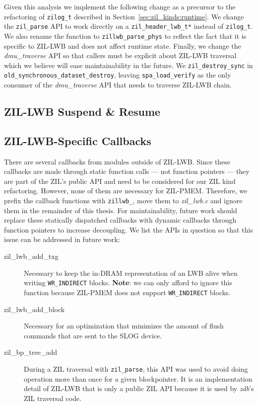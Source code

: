\documentclass[12pt,a4paper,twoside]{book}
\begin{document}
Given this analysis we implement the following change as a precursor to the refactoring of \lstinline{zilog_t} described in Section~\ref{sec:zil_kinds:runtime}.
We change the \lstinline{zil_parse} API to work directly on a \lstinline{zil_header_lwb_t*} instead of \lstinline{zilog_t}.
We also rename the function to \lstinline{zillwb_parse_phys} to reflect the fact that it is specific to ZIL-LWB and does not affect runtime state.
Finally, we change the \textit{dmu\_traverse} API so that callers must be explicit about ZIL-LWB traversal which we believe will ease maintainability in the future.
We \lstinline{zil_destroy_sync} in \lstinline{old_synchronous_dataset_destroy}, leaving \lstinline{spa_load_verify} as the only consumer of the \textit{dmu\_traverse} API that needs to traverse ZIL-LWB chain.

\subsection{ZIL-LWB Suspend \& Resume}\label{sec:zil_kinds:suspend_resume}
\blindtext{}

\subsection{ZIL-LWB-Specific Callbacks}\label{sec:zil_kinds:callbacks}
There are several callbacks from modules outside of ZIL-LWB.
Since these callbacks are made through static function calls --- not function pointers --- they are part of the ZIL's public API and need to be considered for our ZIL kind refactoring.
However, none of them are necessary for ZIL-PMEM.
Therefore, we prefix the callback functions with \lstinline{zillwb_}, move them to \textit{zil\_lwb.c} and ignore them in the remainder of this thesis.
For maintainability, future work should replace these statically dispatched callbacks with dynamic callbacks through function pointers to increase decoupling.
We list the APIs in question so that this issue can be addressed in future work:
\begin{description}
    \item[zil\_lwb\_add\_txg] Necessary to keep the in-DRAM representation of an LWB alive when writing \lstinline{WR_INDIRECT} blocks.
    \textbf{Note}: we can only afford to ignore this function because ZIL-PMEM does not support \lstinline{WR_INDIRECT} blocks.
    \item[zil\_lwb\_add\_block] Necessary for an optimization that minimizes the amount of flush commands that are sent to the SLOG device.
    \item[zil\_bp\_tree\_add] During a ZIL traversal with \lstinline{zil_parse}, this API was used to avoid doing operation more than once for a given blockpointer.
        It is an implementation detail of ZIL-LWB that is only a public ZIL API because it is used by \textit{zdb}'s ZIL traversal code.
\end{description}
\end{document}
